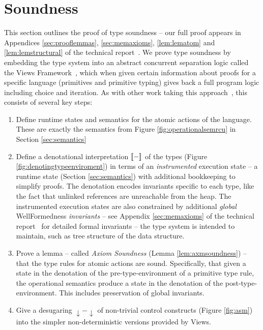 \section{Soundness}
\label{sec:soundness}
This section outlines the proof of type soundness -- our full proof appears in Appendices \ref{sec:prooflemmas}, \ref{sec:memaxioms}, \ref{lem:lematom} and \ref{lem:lemstructural} of the technical report~\cite{isotek}.
We prove type soundness by embedding the type system into an abstract concurrent separation logic called the Views Framework~\cite{views}, which when given certain information about proofs for a specific language (primitives and primitive typing) gives back a full program logic including choice and iteration.  As with other work taking this approach~\cite{oopsla12,toplas17}, this consists of several key steps:
\begin{enumerate}
    \item Define runtime states and semantics for the atomic actions of the language.  These are exactly the semantics from Figure \ref{fig:operationalsemrcu} in Section \ref{sec:semantics}
    \item Define a denotational interpretation $\llbracket-\rrbracket$ of the types (Figure \ref{fig:denotingtypeenviroment}) in terms of an \emph{instrumented} execution state -- a runtime state (Section \ref{sec:semantics}) with additional bookkeeping to simplify proofs.  
    The denotation encodes invariants specific to each type, like the fact that \textsf{unlinked} references are unreachable from the heap. %
    The instrumented execution states are also constrained by additional \textit{global} \textsf{WellFormed}ness \textit{invariants} -- see Appendix \ref{sec:memaxioms} of the technical report~\cite{isotek} for detailed formal invariants -- the type system is intended to maintain, such as tree structure of the data structure.
    \item Prove a lemma -- called \emph{Axiom Soundness} (Lemma \ref{lem:axmsoundness}) -- that the type rules for atomic actions are sound.  Specifically, that given a state in the denotation of the pre-type-environment of a primitive type rule, the operational semantics produce a state in the denotation of the post-type-environment.  This includes preservation of global invariants.
    \item Give a desugaring $\downarrow-\downarrow$ of non-trivial control constructs (Figure \ref{fig:asm}) into the simpler non-deterministic versions provided by Views.
\end{enumerate}
